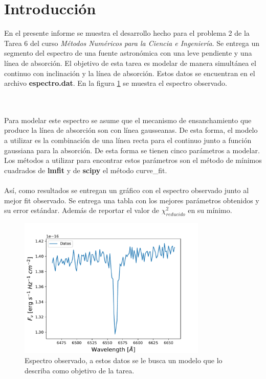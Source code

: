 \documentclass[letterpaper,oneside]{article}
\begin{document}
	
\templatePortrait

\templatePagecfg



\templateIndex

\templateFinalcfg

\section{Introducción}
En el presente informe se muestra el desarrollo hecho para el problema 2 de la Tarea 6 del curso \textit{Métodos Numéricos para la Ciencia e Ingeniería}. Se entrega un segmento del espectro de una fuente astronómica con una leve pendiente y una línea de absorción. El objetivo de esta tarea es modelar de manera simultánea el continuo con inclinación y la línea de absorción. Estos datos se encuentran en el archivo \textbf{espectro.dat}. En la figura \ref{espectro observado} se muestra el espectro observado.

\\ \\
Para modelar este espectro se asume que el mecanismo de ensanchamiento que produce la línea de absorción son con línea gausseanas. De esta forma, el modelo a utilizar es la combinación de una línea recta para el continuo junto a función gaussiana para la absorción. De esta forma se tienen cinco parámetros a modelar. Los métodos a utilizar para encontrar estos parámetros son el método de mínimos cuadrados de \textbf{lmfit} y de \textbf{scipy} el método curve\_fit.
\\ \\

Así, como resultados se entregan un gráfico con el espectro observado junto al mejor fit observado. Se entrega una tabla con los mejores parámetros obtenidos y su error estándar. Además de reportar el valor de $\chi^2_{reducido}$ en su mínimo.
\begin{figure}
    \centering    
    \includegraphics[width=0.8\textwidth]{Tarea 6/Grafico datos.pdf}
    \caption{Espectro observado, a estos datos se le busca un modelo que lo describa como objetivo de la tarea.}
    \label{espectro observado}
\end{figure}{}
\end{document}
